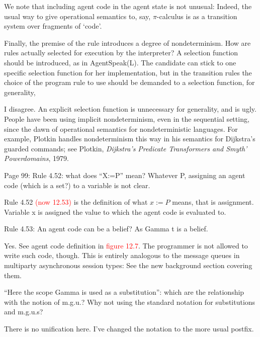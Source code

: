 \documentclass{article}
\newcommand*\R[1]{\textcolor{red}{#1}} %
\newenvironment{them}{\noindent\begingroup\color{blue}}{\endgroup\par}
\begin{document}
We note that including agent code in the agent state is not unusual:
  Indeed, the usual way to give operational semantics to, say,
    $\pi$-calculus is as a transition system over fragments of `code'.

\begin{them}

Finally, the premise of the rule introduces a degree of nondeterminism. How are
rules actually selected for execution by the interpreter? A selection function
should be introduced, as in AgentSpeak(L). The candidate can stick to one
specific selection function for her implementation, but in the transition rules
the choice of the program rule to use should be demanded to a selection
function, for generality,

\end{them}
I disagree.
An explicit selection function is unnecessary for generality, and is ugly.
People have been using implicit nondeterminism,
  even in the sequential setting,
  since the dawn of operational semantics for nondeterministic languages.
For example,
  Plotkin handles nondeterminism this way in his semantics for
  Dijkstra's guarded commands;
see Plotkin, {\it Dijkstra's Predicate Transformers and Smyth' Powerdomains},
  1979.


\begin{them}

Page 99:
Rule 4.52: what does “X:=P” mean? Whatever P, assigning an agent code (which is
a set?) to a variable is not clear.

\end{them}
Rule 4.52 \R{(now 12.53)} is the definition of what $x:=P$ means, that is
assignment. Variable x is assigned the value to which the agent code is
evaluated to.

\begin{them}

Rule 4.53:
An agent code can be a belief? As Gamma t is a belief.
\end{them}
Yes. See agent code definition in \R{figure 12.7}.
The programmer is not allowed to write such code, though.
This is entirely analogous to the message queues in
  multiparty asynchronous session types:
  See the new background section covering them.

\begin{them}

“Here the scope Gamma is used as a substitution”: which are the relationship
with the notion of m.g.u.? Why not using the standard notation for
substitutions and m.g.u.s?

\end{them}
There is no unification here. I've changed the notation to the more usual
postfix.
\end{document}
